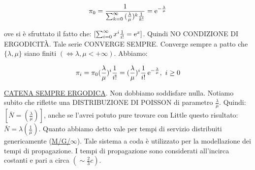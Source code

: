 \[
	\pi_0 = \frac{1}{\sum_{k=0}^\infty{(\frac{\lambda}{\mu})^k \frac{1}{k!}}} = \mathop{}\!\mathrm{e}^{-\frac{\lambda}{\mu}}
\]

ove si è sfruttato il fatto che: $[\sum_{i=0}^\infty{x^i\frac{1}{i!}} = \mathop{}\!\mathrm{e}^x]$. Quindi NO CONDIZIONE DI ERGODICIT\`A. Tale serie CONVERGE SEMPRE. Converge sempre a patto che $\{\lambda,\mu\}$ siano finiti $(\iff \lambda,\mu <+\infty)$. Abbiamo:

\[
	\pi_i = \pi_0 (\frac{\lambda}{\mu})^i \frac{1}{i!} = (\frac{\lambda}{\mu})^i \frac{1}{i!}\mathop{}\!\mathrm{e}^{-\frac{\lambda}{\mu}},\ i\geq 0
\]

\underline{CATENA SEMPRE ERGODICA}. Non dobbiamo soddisfare nulla. Notiamo subito che riflette una DISTRIBUZIONE DI POISSON di parametro $\frac{\lambda}{\mu}$. Quindi: $[\bar{N} = (\frac{\lambda}{\mu})]$, anche se l'avrei potuto pure trovare con Little questo risultato: $\bar{N} = \lambda (\frac{1}{\mu})$. Quanto abbiamo detto vale per tempi di servizio distribuiti genericamente (\underline{\underline{M/G/$\infty$}}).
Tale sistema a coda è utilizzato per la modellazione dei tempi di propagazione. I tempi di propagazione sono considerati all'incirca costanti e pari a circa $(\sim \frac{2}{3} c)$.